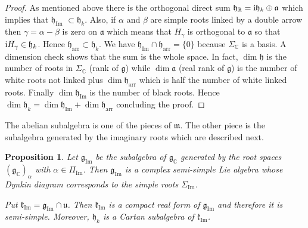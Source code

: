 \documentclass[10pt,a4paper]{amsart}
\numberwithin{equation}{section}
\newtheorem{Proposition}[Theorem]{Proposition}
 { \theoremstyle{definition}
\newtheorem{Definition}[Theorem]{Definition}
\newtheorem{Note}[Theorem]{Note}
\newtheorem{Example}[Theorem]{Example}
\newtheorem{Remark}[Theorem]{Remark} }
\newcommand{\func}[1]{\operatorname{#1}}
\begin{document}
\begin{proof}As mentioned above there is the orthogonal direct sum $\mathfrak{h}_{\mathbb{R}}={\rm i}\mathfrak{h}_{k}\oplus \mathfrak{a}$ which implies that $\mathfrak{h}_{\func{Im}}$ $\subset \mathfrak{h}_{k}$. Also, if $\alpha $ and $\beta $ are simple roots linked by a double arrow then $\gamma =\alpha -\beta $ is zero on $\mathfrak{a}$ which means that $H_{\gamma }$ is orthogonal to $\mathfrak{a}$ so that ${\rm i}H_{\gamma }\in \mathfrak{h}_{k}$. Hence $\mathfrak{h}_{\mathrm{arr}}\subset \mathfrak{h}_{k}$. We have $\mathfrak{h}_{\func{Im}}\cap \mathfrak{h}_{\mathrm{arr}}=\{0\}$ because $\Sigma _{\mathbb{C}}$ is a basis. A dimension check shows that the sum is the whole space. In fact, $\dim \mathfrak{h}$ is the number of roots in $\Sigma _{\mathbb{C}}$ (rank of $\mathfrak{g}$) while $\dim \mathfrak{a}$ (real rank of $\mathfrak{g}$) is the number of white roots not linked plus $\dim \mathfrak{h}_{\mathrm{arr}}$ which is half the number of white linked roots. Finally $\dim \mathfrak{h}_{\func{Im}}$ is the number of black roots. Hence $\dim \mathfrak{h}_{k}=\dim \mathfrak{h}_{\func{Im}}+\dim \mathfrak{h}_{\mathrm{arr}}$ concluding the proof.
\end{proof}

The abelian subalgebra is one of the pieces of $\mathfrak{m}$. The other piece is the subalgebra generated by the imaginary roots which are described next.

\begin{Proposition}Let $\mathfrak{g}_{\func{Im}}$ be the subalgebra of $\mathfrak{g}_{\mathbb{C}}$ generated by the root spaces $( \mathfrak{g}_{\mathbb{C}})_{\alpha }$ with \mbox{$\alpha \in \Pi _{\func{Im}}$}. Then $\mathfrak{g}_{\func{Im}}$ is a complex semi-simple Lie algebra whose Dynkin diagram corresponds to the simple roots $\Sigma _{\func{Im}}$.

Put $\mathfrak{k}_{\func{Im}}=\mathfrak{g}_{\func{Im}}\cap \mathfrak{u}$. Then $\mathfrak{k}_{\func{Im}}$ is a compact real form of $\mathfrak{g}_{\func{Im}}$ and therefore it is semi-simple. Moreover, $\mathfrak{h}_{k}$ is a Cartan subalgebra of $\mathfrak{k}_{\func{Im}}$.
\end{Proposition}
\end{document}
